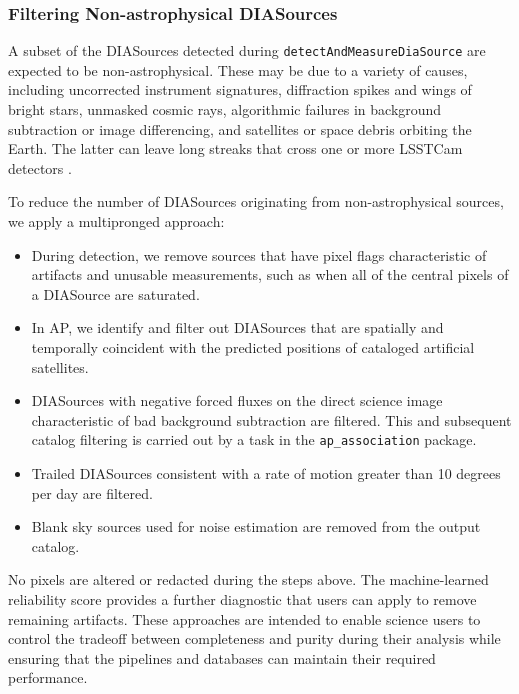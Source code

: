 \subsubsection{Filtering Non-astrophysical DIASources}
\label{sec:streaks}

A subset of the DIASources detected during \texttt{detectAndMeasureDiaSource} are expected to be non-astrophysical.
These may be due to a variety of causes, including uncorrected instrument signatures, diffraction spikes and wings of bright stars, unmasked cosmic rays, algorithmic failures in background subtraction or image differencing, and satellites or space debris orbiting the Earth.
The latter can leave long streaks that cross one or more LSSTCam detectors
\citep{2020AJ....160..226T,2022A&C....3900584H}.

To reduce the number of DIASources originating from non-astrophysical sources, we apply a multipronged approach:

\begin{itemize}
\item During detection, we remove sources that have pixel flags characteristic of artifacts and unusable measurements, such as when all of the central pixels of a DIASource are saturated.

\item In AP, we identify and filter out DIASources that are spatially and temporally coincident with the predicted positions of cataloged artificial satellites.

\item DIASources with negative forced fluxes on the direct science image characteristic of bad background subtraction are filtered.
      This and subsequent catalog filtering is carried out by a task in the \texttt{ap\_association} package.

\item Trailed DIASources consistent with a rate of motion greater than 10 degrees per day are filtered.

\item Blank sky sources  used for noise estimation are removed from the output catalog.

\end{itemize}

No pixels are altered or redacted during the steps above.
The machine-learned reliability score  provides a further diagnostic that users can apply to remove remaining artifacts.
These approaches are intended to enable science users to control the tradeoff between completeness and purity during their analysis while ensuring that the pipelines and databases can maintain their required performance.

